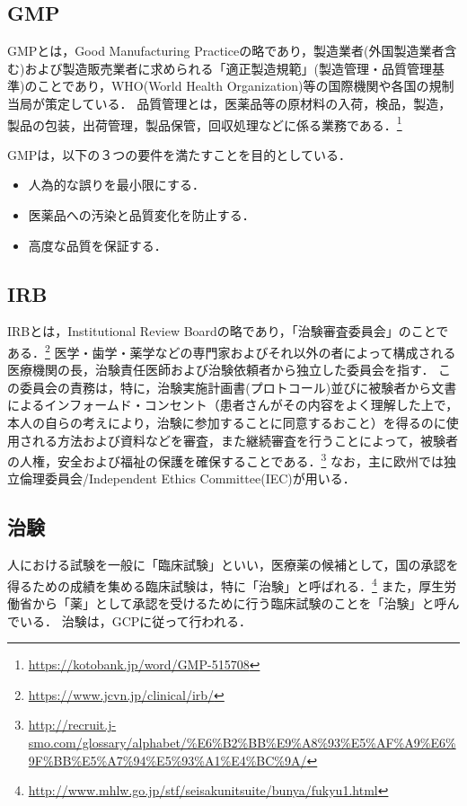 \documentclass[uplatex,a4paper]{jsarticle}
\begin{document}
\subsection{GMP}
GMPとは，Good Manufacturing Practiceの略であり，製造業者(外国製造業者含む)および製造販売業者に求められる「適正製造規範」(製造管理・品質管理基準)のことであり，WHO(World Health Organization)等の国際機関や各国の規制当局が策定している．
品質管理とは，医薬品等の原材料の入荷，検品，製造，製品の包装，出荷管理，製品保管，回収処理などに係る業務である．\footnote{\url{https://kotobank.jp/word/GMP-515708}}

GMPは，以下の３つの要件を満たすことを目的としている．
\begin{itemize}
    \item 人為的な誤りを最小限にする．
    \item 医薬品への汚染と品質変化を防止する．
    \item 高度な品質を保証する．
\end{itemize}


\subsection{IRB}
IRBとは，Institutional Review Boardの略であり，「治験審査委員会」のことである．\footnote{\url{https://www.jcvn.jp/clinical/irb/}}
医学・歯学・薬学などの専門家およびそれ以外の者によって構成される医療機関の長，治験責任医師および治験依頼者から独立した委員会を指す．
この委員会の責務は，特に，治験実施計画書(プロトコール)並びに被験者から文書によるインフォームド・コンセント（患者さんがその内容をよく理解した上で，本人の自らの考えにより，治験に参加することに同意するおこと）を得るのに使用される方法および資料などを審査，また継続審査を行うことによって，被験者の人権，安全および福祉の保護を確保することである．\footnote{\url{http://recruit.j-smo.com/glossary/alphabet/%E6%B2%BB%E9%A8%93%E5%AF%A9%E6%9F%BB%E5%A7%94%E5%93%A1%E4%BC%9A/}}
なお，主に欧州では独立倫理委員会/Independent Ethics Committee(IEC)が用いる．


\subsection{治験}
人における試験を一般に「臨床試験」といい，医療薬の候補として，国の承認を得るための成績を集める臨床試験は，特に「治験」と呼ばれる．\footnote{\url{http://www.mhlw.go.jp/stf/seisakunitsuite/bunya/fukyu1.html}}
また，厚生労働省から「薬」として承認を受けるために行う臨床試験のことを「治験」と呼んでいる．
治験は，GCPに従って行われる．
\end{document}
